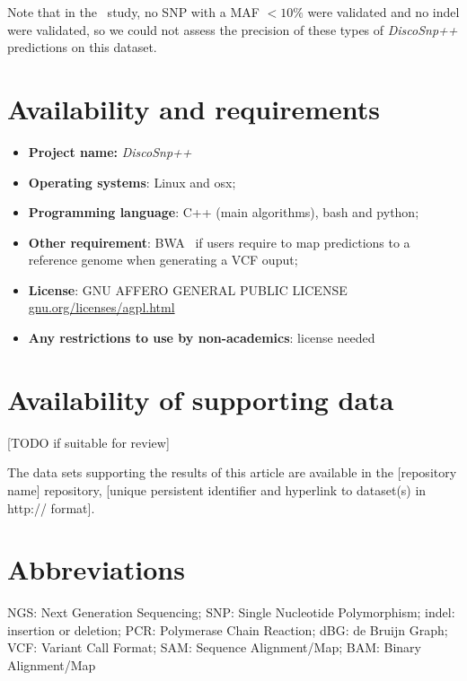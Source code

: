 \documentclass{bmcart}
\newcommand{\discopp}{{\it DiscoSnp++}\xspace}
\begin{document}

Note that in the~\cite{Kvitek2013} study, no SNP with a MAF $<10\%$ were validated and no indel were validated, so we could not assess the precision of these types of \discopp predictions on this dataset.


\section*{Availability and requirements}
\begin{itemize}
	\item \textbf{Project name:} \discopp
	\item \textbf{Operating systems}: Linux and osx;
	\item \textbf{Programming language}: C++ (main algorithms), bash and python;
	\item \textbf{Other requirement}: BWA~\cite{bwa} if users require to map predictions to a reference genome when generating a VCF ouput;
	\item \textbf{License}: GNU AFFERO GENERAL PUBLIC LICENSE \url{gnu.org/licenses/agpl.html}
	\item \textbf{Any restrictions to use by non-academics}: license needed
\end{itemize}


\section*{Availability of supporting data}
[TODO if suitable for review]

The data sets supporting the results of this article are available in the [repository name] repository, [unique persistent identifier and hyperlink to dataset(s) in http:// format].


\section*{Abbreviations}
NGS: Next Generation Sequencing; SNP: Single Nucleotide Polymorphism; indel: insertion or deletion; PCR: Polymerase Chain Reaction; dBG: de Bruijn Graph; VCF: Variant Call Format; SAM: Sequence Alignment/Map; BAM: Binary Alignment/Map
\end{document}
